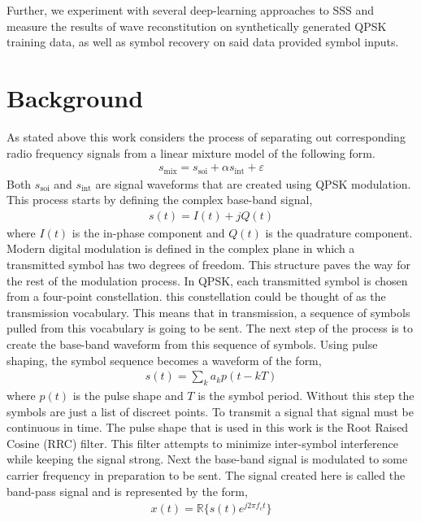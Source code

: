 \documentclass[conference]{IEEEtran}
\begin{document}
Further, we experiment with several deep-learning approaches to SSS and measure the results of wave reconstitution on synthetically generated QPSK training data, as well as symbol recovery on said data provided symbol inputs. 

\section{Background}
As stated above this work considers the process of separating out corresponding radio frequency signals from a linear mixture model of the following form.
\begin{align*}
    s_{\text{mix}} = s_{\text{soi}} + \alpha s_{\text{int}} + \varepsilon
\end{align*}
Both $s_{\text{soi}}$ and $s_{\text{int}}$ are signal waveforms that are created using QPSK modulation. This process starts by defining the complex base-band signal,
\begin{align*}
    s(t) = I(t) + jQ(t)
\end{align*}
where $I(t)$ is the in-phase component and $Q(t)$ is the quadrature component. Modern digital modulation is defined in the complex plane in which a transmitted symbol has two degrees of freedom. This structure paves the way for the rest of the modulation process. In QPSK, each transmitted symbol is chosen from a four-point constellation. this constellation could be thought of as the transmission vocabulary. This means that in transmission, a sequence of symbols pulled from this vocabulary is going to be sent. The next step of the process is to create the base-band waveform from this sequence of symbols. Using pulse shaping, the symbol sequence becomes a waveform of the form, 
\begin{align*}
    s(t) = \sum_ka_kp(t-kT)
\end{align*}
where $p(t)$ is the pulse shape and $T$ is the symbol period. Without this step the symbols are just a list of discreet points. To transmit a signal that signal must be continuous in time. The pulse shape that is used in this work is the Root Raised Cosine (RRC) filter. This filter attempts to minimize inter-symbol interference while keeping the signal strong. Next the base-band signal is modulated to some carrier frequency in preparation to be sent. The signal created here is called the band-pass signal and is represented by the form, 
\begin{align*}
    x(t) = \mathbb{R}\{{{s(t)e^{j2\pi f_ct}}}\}
\end{align*}
\end{document}
